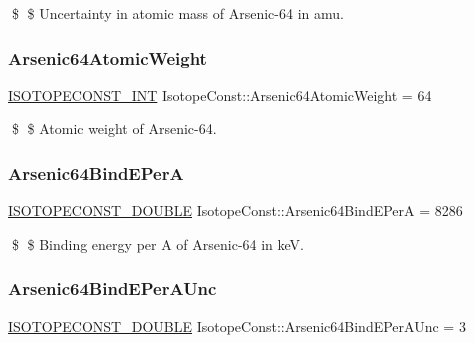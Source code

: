 \$ \$ Uncertainty in atomic mass of Arsenic-\/64 in amu. \mbox{\label{group___isotope_const-_arsenic-_as64_gaf10985440db7a7c598244a36f85c5c2f}} 
\subsubsection{\texorpdfstring{Arsenic64\+Atomic\+Weight}{Arsenic64AtomicWeight}}
{\footnotesize\ttfamily \mbox{\hyperlink{group___isotope_const-_macros_ga5f18360b3e99483a35c32d789e62621c}{I\+S\+O\+T\+O\+P\+E\+C\+O\+N\+S\+T\+\_\+\+I\+NT}} Isotope\+Const\+::\+Arsenic64\+Atomic\+Weight = 64}

\$ \$ Atomic weight of Arsenic-\/64. \mbox{\label{group___isotope_const-_arsenic-_as64_ga070fd9841841b7f2bf29ab5c1d37a28c}} 
\subsubsection{\texorpdfstring{Arsenic64\+Bind\+E\+PerA}{Arsenic64BindEPerA}}
{\footnotesize\ttfamily \mbox{\hyperlink{group___isotope_const-_macros_ga8f45a7272ce02c0b4c65c44636ed719a}{I\+S\+O\+T\+O\+P\+E\+C\+O\+N\+S\+T\+\_\+\+D\+O\+U\+B\+LE}} Isotope\+Const\+::\+Arsenic64\+Bind\+E\+PerA = 8286}

\$ \$ Binding energy per A of Arsenic-\/64 in keV. \mbox{\label{group___isotope_const-_arsenic-_as64_ga3adb19673ab1070a8a8153651946d820}} 
\subsubsection{\texorpdfstring{Arsenic64\+Bind\+E\+Per\+A\+Unc}{Arsenic64BindEPerAUnc}}
{\footnotesize\ttfamily \mbox{\hyperlink{group___isotope_const-_macros_ga8f45a7272ce02c0b4c65c44636ed719a}{I\+S\+O\+T\+O\+P\+E\+C\+O\+N\+S\+T\+\_\+\+D\+O\+U\+B\+LE}} Isotope\+Const\+::\+Arsenic64\+Bind\+E\+Per\+A\+Unc = 3}

